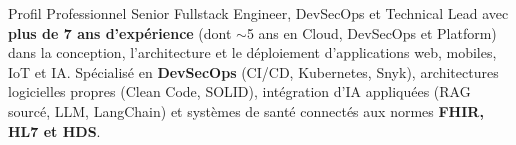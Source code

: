 \documentclass{resume}
\begin{document}
\begin{rSection}{Profil Professionnel}
Senior Fullstack Engineer, DevSecOps et Technical Lead avec {\bf plus de 7 ans d'expérience} (dont $\sim$5 ans en Cloud, DevSecOps et Platform) dans la conception, l'architecture et le déploiement d'applications web, mobiles, IoT et IA. Spécialisé en {\bf DevSecOps} (CI/CD, Kubernetes, Snyk), architectures logicielles propres (Clean Code, SOLID), intégration d'IA appliquées (RAG sourcé, LLM, LangChain) et systèmes de santé connectés aux normes {\bf FHIR, HL7 et HDS}.
\end{rSection}

\end{document}

